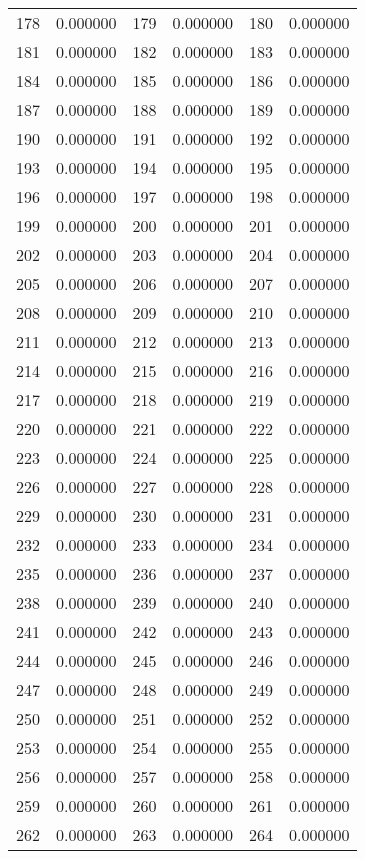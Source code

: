 \documentclass[12pt]{article}
\begin{document}
\begin{longtable}{@{}cc|cc|cc@{}}
178 & 0.000000 & 179 & 0.000000 & 180 & 0.000000 \\
181 & 0.000000 & 182 & 0.000000 & 183 & 0.000000 \\
184 & 0.000000 & 185 & 0.000000 & 186 & 0.000000 \\
187 & 0.000000 & 188 & 0.000000 & 189 & 0.000000 \\
190 & 0.000000 & 191 & 0.000000 & 192 & 0.000000 \\
193 & 0.000000 & 194 & 0.000000 & 195 & 0.000000 \\
196 & 0.000000 & 197 & 0.000000 & 198 & 0.000000 \\
199 & 0.000000 & 200 & 0.000000 & 201 & 0.000000 \\
202 & 0.000000 & 203 & 0.000000 & 204 & 0.000000 \\
205 & 0.000000 & 206 & 0.000000 & 207 & 0.000000 \\
208 & 0.000000 & 209 & 0.000000 & 210 & 0.000000 \\
211 & 0.000000 & 212 & 0.000000 & 213 & 0.000000 \\
214 & 0.000000 & 215 & 0.000000 & 216 & 0.000000 \\
217 & 0.000000 & 218 & 0.000000 & 219 & 0.000000 \\
220 & 0.000000 & 221 & 0.000000 & 222 & 0.000000 \\
223 & 0.000000 & 224 & 0.000000 & 225 & 0.000000 \\
226 & 0.000000 & 227 & 0.000000 & 228 & 0.000000 \\
229 & 0.000000 & 230 & 0.000000 & 231 & 0.000000 \\
232 & 0.000000 & 233 & 0.000000 & 234 & 0.000000 \\
235 & 0.000000 & 236 & 0.000000 & 237 & 0.000000 \\
238 & 0.000000 & 239 & 0.000000 & 240 & 0.000000 \\
241 & 0.000000 & 242 & 0.000000 & 243 & 0.000000 \\
244 & 0.000000 & 245 & 0.000000 & 246 & 0.000000 \\
247 & 0.000000 & 248 & 0.000000 & 249 & 0.000000 \\
250 & 0.000000 & 251 & 0.000000 & 252 & 0.000000 \\
253 & 0.000000 & 254 & 0.000000 & 255 & 0.000000 \\
256 & 0.000000 & 257 & 0.000000 & 258 & 0.000000 \\
259 & 0.000000 & 260 & 0.000000 & 261 & 0.000000 \\
262 & 0.000000 & 263 & 0.000000 & 264 & 0.000000 \\

\end{longtable}
\end{document}
